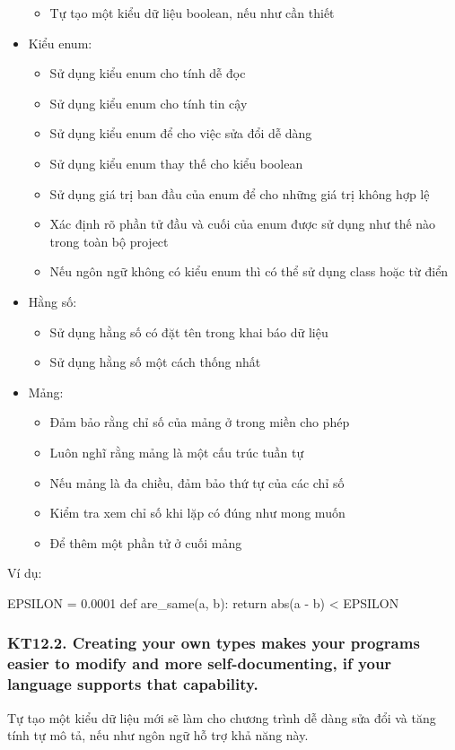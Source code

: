 \documentclass[12pt]{report}
\begin{document}
\begin{itemize}
\begin{itemize}
			\item Tự tạo một kiểu dữ liệu boolean, nếu như cần thiết 
		\end{itemize}
	\item Kiểu enum:
		\begin{itemize}
			\item Sử dụng kiểu enum cho tính dễ đọc 
			\item Sử dụng kiểu enum cho tính tin cậy
			\item Sử dụng kiểu enum để cho việc sửa đổi dễ dàng 
			\item Sử dụng kiểu enum thay thế cho kiểu boolean 
			\item Sử dụng giá trị ban đầu của enum để cho những giá trị không hợp lệ
			\item Xác định rõ phần tử đầu và cuối của enum được sử dụng như thế nào trong toàn bộ project 
			\item Nếu ngôn ngữ không có kiểu enum thì có thể sử dụng class hoặc từ điển  
		\end{itemize}
	\item Hằng số:
		\begin{itemize}
			\item Sử dụng hằng số có đặt tên trong khai báo dữ liệu 
			\item Sử dụng hằng số một cách thống nhất 
		\end{itemize}
	\item Mảng:
		\begin{itemize}
			\item Đảm bảo rằng chỉ số của mảng ở trong miền cho phép 
			\item Luôn nghĩ rằng mảng là một cấu trúc tuần tự 
			\item Nếu mảng là đa chiều, đảm bảo thứ tự của các chỉ số 
			\item Kiểm tra xem chỉ số khi lặp có đúng như mong muốn 
			\item Để thêm một phần tử ở cuối mảng 
		\end{itemize}
\end{itemize}
Ví dụ: 

\begin{python}
EPSILON = 0.0001
def are_same(a, b):
	return abs(a - b) < EPSILON
\end{python}


\subsubsection{KT12.2. Creating your own types makes your programs easier to modify and more self-documenting, if your language supports that capability.}
Tự tạo một kiểu dữ liệu mới sẽ làm cho chương trình dễ dàng sửa đổi và tăng tính tự mô tả, nếu như ngôn ngữ hỗ trợ khả năng này.
\end{document}
